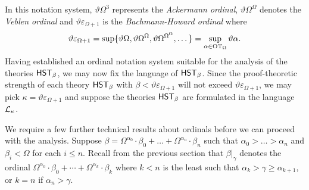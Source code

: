 \documentclass[UKenglish,cleveref,DIV=12]{scrartcl}
\theoremstyle{definition}
\theoremstyle{definition}
\begin{document}
In this notation system, $\vartheta\Omega^3$ represents the {\em Ackermann ordinal}, $\vartheta\Omega^\Omega$ denotes the {\em Veblen ordinal} and $\vartheta\varepsilon_{\Omega+1}$ is the {\em Bachmann-Howard ordinal} where
\begin{align*}
 \vartheta\varepsilon_{\Omega+1}=\sup\{\vartheta\Omega, \vartheta\Omega^\Omega,\vartheta\Omega^{\Omega^\Omega},\dots\}=\sup_{\alpha\in\mathrm{OT}_\Omega}\vartheta\alpha.
\end{align*}
Having established an ordinal notation system suitable for the analysis of the theories $\mathsf{HST}_\beta$, we may now fix the language of $\mathsf{HST}_\beta$. Since the proof-theoretic strength of each theory $\mathsf{HST}_\beta$ with $\beta<\vartheta\varepsilon_{\Omega+1}$ will not exceed $\vartheta\varepsilon_{\Omega+1}$, we may pick $\kappa=\vartheta\varepsilon_{\Omega+1}$ and suppose the theories $\mathsf{HST}_\beta$ are formulated in the language $\mathcal{L}_\kappa$.

We require a few further technical results about ordinals before we can proceed with
the analysis. Suppose
$\beta=\Omega^{\alpha_0}\cdot\beta_0+\dots+\Omega^{\alpha_n}\cdot\beta_n$ such
that $\alpha_0>\dots>\alpha_n$ and $\beta_i<\Omega$ for each $i\le n$. Recall
from the previous section that $\beta|_\gamma$ denotes the ordinal
$\Omega^{\alpha_0}\cdot\beta_0+\cdots+\Omega^{\alpha_k}\cdot\beta_k$ where $k<n$
is the least such that $\alpha_{k}>\gamma\ge\alpha_{k+1}$, or $k=n$ if
$\alpha_n>\gamma$.
\end{document}
